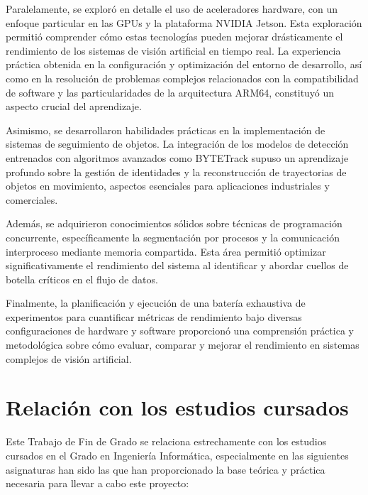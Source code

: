 \documentclass[11pt,spanish,listoffigures,listoftables]{tfgetsinf}
\begin{document}
Paralelamente, se exploró en detalle el uso de aceleradores hardware, con un enfoque particular en las GPUs y la plataforma NVIDIA Jetson. Esta exploración permitió comprender cómo estas tecnologías pueden mejorar drásticamente el rendimiento de los sistemas de visión artificial en tiempo real. La experiencia práctica obtenida en la configuración y optimización del entorno de desarrollo, así como en la resolución de problemas complejos relacionados con la compatibilidad de software y las particularidades de la arquitectura ARM64, constituyó un aspecto crucial del aprendizaje.

Asimismo, se desarrollaron habilidades prácticas en la implementación de sistemas de seguimiento de objetos. La integración de los modelos de detección entrenados con algoritmos avanzados como BYTETrack supuso un aprendizaje profundo sobre la gestión de identidades y la reconstrucción de trayectorias de objetos en movimiento, aspectos esenciales para aplicaciones industriales y comerciales.

Además, se adquirieron conocimientos sólidos sobre técnicas de programación concurrente, específicamente la segmentación por procesos y la comunicación interproceso mediante memoria compartida. Esta área permitió optimizar significativamente el rendimiento del sistema al identificar y abordar cuellos de botella críticos en el flujo de datos.

Finalmente, la planificación y ejecución de una batería exhaustiva de experimentos para cuantificar métricas de rendimiento bajo diversas configuraciones de hardware y software proporcionó una comprensión práctica y metodológica sobre cómo evaluar, comparar y mejorar el rendimiento en sistemas complejos de visión artificial.


\section{Relación con los estudios cursados}

Este Trabajo de Fin de Grado se relaciona estrechamente con los estudios cursados en el Grado en Ingeniería Informática, especialmente en las siguientes asignaturas han sido las que han proporcionado la base teórica y práctica necesaria para llevar a cabo este proyecto:
\end{document}
